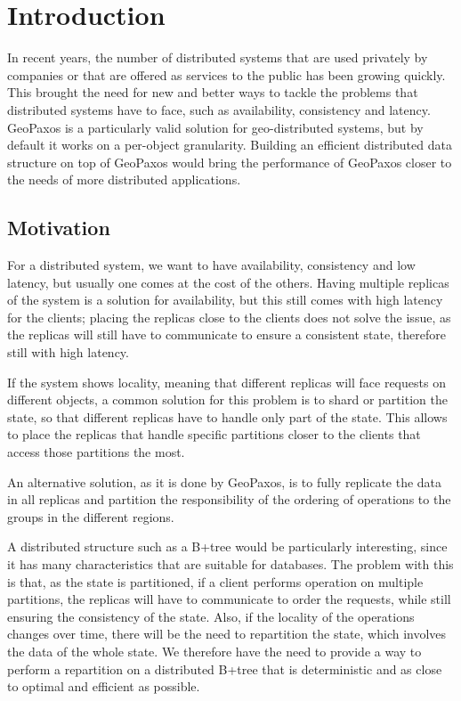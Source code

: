 \chapter{Introduction}\label{sec:introduction}
In recent years, the number of distributed systems that are used privately by companies or that are offered as services to the public has been growing quickly. This brought the need for new and better ways to tackle the problems that distributed systems have to face, such as availability, consistency and latency. GeoPaxos is a particularly valid solution for geo-distributed systems, but by default it works on a per-object granularity. Building an efficient distributed data structure on top of GeoPaxos would bring the performance of GeoPaxos closer to the needs of more distributed applications.

\section{Motivation}\label{sec:motivation}
For a distributed system, we want to have availability, consistency and low latency, but usually one comes at the cost of the others. Having multiple replicas of the system is a solution for availability, but this still comes with high latency for the clients; placing the replicas close to the clients does not solve the issue, as the replicas will still have to communicate to ensure a consistent state, therefore still with high latency.

If the system shows locality, meaning that different replicas will face requests on different objects, a common solution for this problem is to shard or partition the state, so that different replicas have to handle only part of the state. This allows to place the replicas that handle specific partitions closer to the clients that access those partitions the most.

An alternative solution, as it is done by GeoPaxos, is to fully replicate the data in all replicas and partition the responsibility of the ordering of operations to the groups in the different regions.

A distributed structure such as a B+tree would be particularly interesting, since it has many characteristics that are suitable for databases. The problem with this is that, as the state is partitioned, if a client performs operation on multiple partitions, the replicas will have to communicate to order the requests, while still ensuring the consistency of the state. Also, if the locality of the operations changes over time, there will be the need to repartition the state, which involves the data of the whole state. We therefore have the need to provide a way to perform a repartition on a distributed B+tree that is deterministic and as close to optimal and efficient as possible.

